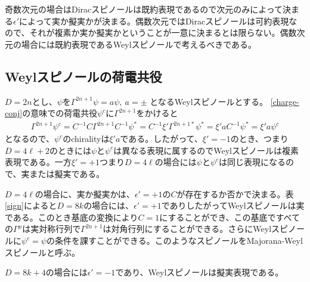 \documentclass[12pt,a4paper]{jlreq}
\begin{document}
奇数次元の場合はDiracスピノールは既約表現であるので次元のみによって決まる$\epsilon'$によって実か擬実かが決まる。偶数次元ではDiracスピノールは可約表現なので、それが複素か実か擬実かということが一意に決まるとは限らない。偶数次元の場合には既約表現であるWeylスピノールで考えるべきである。

\subsection{Weylスピノールの荷電共役}
$D=2n$とし、$\psi$を$\Gamma^{2n+1}\psi=a \psi,\ a=\pm$ となるWeylスピノールとする。
\eqref{charge-conj}の意味での荷電共役$\psi^c$に$\Gamma^{2n+1}$をかけると
\begin{align*}
  \Gamma^{2n+1}\psi^{c}
  =C^{-1}C\Gamma^{2n+1}C^{-1}\psi^{*}
  =C^{-1}\xi' \Gamma^{2n+1 *} \psi^{*}
  =\xi' a C^{-1}\psi^{*}
  =\xi' a \psi^{c}
\end{align*}
となるので、$\psi^{c}$のchiralityは$\xi' a$である。したがって、$\xi'=-1$のとき、つまり$D=4\ell+2$のときには$\psi$と$\psi^c$は異なる表現に属するのでWeylスピノールは複素表現である。一方$\xi'=+1$つまり$D=4\ell$の場合には$\psi$と$\psi^c$は同じ表現になるので、実または擬実である。

$D=4\ell$の場合に、実か擬実かは、$\epsilon'=+1$の$C$が存在するか否かで決まる。表\ref{sign}によると$D=8k$の場合には、$\epsilon'=+1$でありしたがってWeylスピノールは実である。このとき基底の変換により$C=1$にすることができ、この基底ですべての$\Gamma^{\mu}$は実対称行列で$\Gamma^{2n+1}$は対角行列にすることができる。さらにWeylスピノールに$\psi^c=\psi$の条件を課すことができる。このようなスピノールをMajorana-Weylスピノールと呼ぶ。

$D=8k+4$の場合には$\epsilon'=-1$であり、Weylスピノールは擬実表現である。
\end{document}
